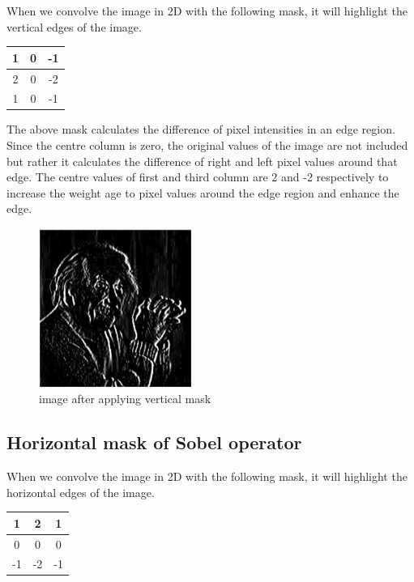 \documentclass[11pt]{article}
\begin{document}
When we convolve the image in 2D with the following mask, it will highlight the vertical edges of the image. 
\begin{center}
\begin{tabular}{| c| c |c |}
\hline
 1 & 0 & -1 \\ 
 \hline
 2 & 0 & -2 \\
 \hline
 1 & 0 & -1  \\
 \hline
\end{tabular}
\end{center}

The above mask calculates the difference of pixel intensities in an edge region. Since the centre column is zero, the original values of the image are not included but rather it calculates the difference of right and left pixel values around that edge. The centre values of first and third column are 2 and -2 respectively to increase the weight age to pixel values around the edge region and enhance the edge.

\begin{figure}[htp]
\centering
\includegraphics[width=5cm]{sobel2.jpg}
\caption{image after applying vertical mask}
\label{fig:Einstein Vertical}
\end{figure}

\subsection{Horizontal mask of Sobel operator}

When we convolve the image in 2D with the following mask, it will highlight the horizontal edges of the image. 
\begin{center}
\begin{tabular}{| c| c |c |}
\hline
 1 & 2 & 1 \\ 
 \hline
 0 & 0 & 0 \\
 \hline
 -1 & -2 & -1  \\
 \hline
\end{tabular}
\end{center}
\end{document}
